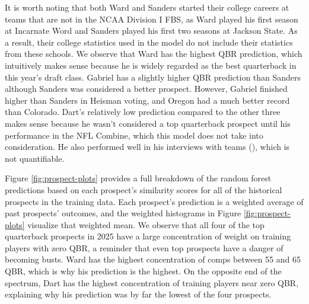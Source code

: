 \documentclass{article}
\begin{document}
It is worth noting that both Ward and Sanders started their college careers at teams that are not in the NCAA Division I FBS, as Ward played his first season at Incarnate Word and Sanders played his first two seasons at Jackson State. As a result, their college statistics used in the model do not include their statistics from these schools. We observe that Ward has the highest QBR prediction, which intuitively makes sense because he is widely regarded as the best quarterback in this year's draft class. Gabriel has a slightly higher QBR prediction than Sanders although Sanders was considered a better prospect. However, Gabriel finished higher than Sanders in Heisman voting, and Oregon had a much better record than Colorado. Dart's relatively low prediction compared to the other three makes sense because he wasn't considered a top quarterback prospect until his performance in the NFL Combine, which this model does not take into consideration. He also performed well in his interviews with teams (\cite{traina_qb_2025}), which is not quantifiable.

Figure \ref{fig:prospect-plots} provides a full breakdown of the random forest predictions based on each prospect's similarity scores for all of the historical prospects in the training data. Each prospect's prediction is a weighted average of past prospects' outcomes, and the weighted histograms in Figure \ref{fig:prospect-plots} visualize that weighted mean. We observe that all four of the top quarterback prospects in 2025 have a large concentration of weight on training players with zero QBR, a reminder that even top prospects have a danger of becoming busts. Ward has the highest concentration of comps between 55 and 65 QBR, which is why his prediction is the highest. On the opposite end of the spectrum, Dart has the highest concentration of training players near zero QBR, explaining why his prediction was by far the lowest of the four prospects.
\end{document}
